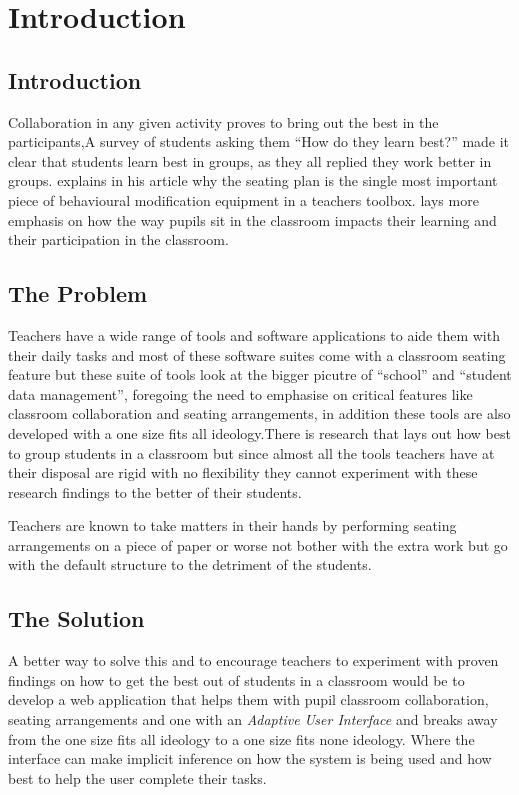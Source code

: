 \section{Introduction}
\subsection{Introduction} 
Collaboration in any given activity proves to bring out the best in the participants,A survey of students asking them ``How do they learn best?'' made it clear that students learn best in groups, as they all replied they work better in groups.\cite{website:TES} explains in his article why the seating plan is the single most important piece of behavioural modification equipment in a teachers toolbox. \cite{website:TES}lays more emphasis on how the way pupils sit in the classroom impacts their learning and their participation in the classroom. 
\subsection{The Problem}
Teachers have a wide range of tools and software applications to aide them with their daily tasks and most of these software suites come with a classroom seating feature but these suite of tools look at the bigger picutre of ``school'' and ``student data management'', foregoing the need to emphasise on critical features like classroom collaboration and seating arrangements, in addition these tools are also developed with a one size fits all ideology.There is research that lays out how best to group students in a classroom but since almost all the tools teachers have at their disposal are rigid with no flexibility they cannot experiment with these research findings to the better of their students.

Teachers are known to take matters in their hands by performing seating arrangements on a piece of paper or worse not bother with the extra work but go with the default structure to the detriment of the students.

\subsection{The Solution}
A better way to solve this and to encourage teachers to experiment with proven findings on how to get the best out of students in a classroom would be to develop a web application that helps them with pupil classroom collaboration, seating arrangements and one with an \emph{Adaptive User Interface} and breaks away from the one size fits all ideology to a one size fits none ideology. Where the interface can make implicit inference on how the system is being used and how best to help the user complete their tasks.

